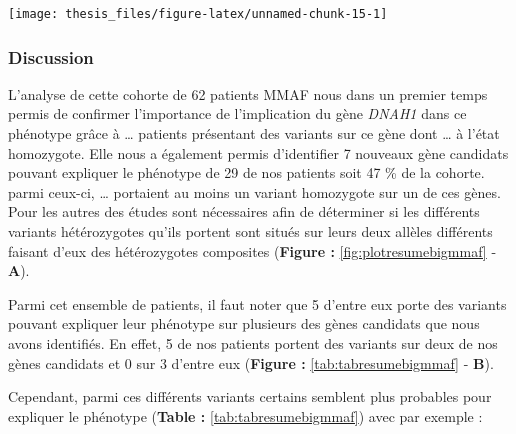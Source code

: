\documentclass[12pt,twoside]{reedthesis}
\theoremstyle{definition}
\theoremstyle{definition}
\theoremstyle{remark}
\begin{document}
  \begin{center}\texttt{[image: thesis\_files/figure-latex/unnamed-chunk-15-1]} \end{center}
  
  \newpage
  
  \newpage
  
  \subsubsection{Discussion}\label{discussion-1}
  
  L'analyse de cette cohorte de 62 patients MMAF nous dans un premier
  temps permis de confirmer l'importance de l'implication du gène
  \emph{DNAH1} dans ce phénotype grâce à \ldots{} patients présentant des
  variants sur ce gène dont \ldots{} à l'état homozygote. Elle nous a
  également permis d'identifier 7 nouveaux gène candidats pouvant
  expliquer le phénotype de 29 de nos patients soit 47 \% de la cohorte.
  parmi ceux-ci, \ldots{} portaient au moins un variant homozygote sur un
  de ces gènes. Pour les autres des études sont nécessaires afin de
  déterminer si les différents variants hétérozygotes qu'ils portent sont
  situés sur leurs deux allèles différents faisant d'eux des hétérozygotes
  composites (\textbf{Figure : }\ref{fig:plotresumebigmmaf} - \textbf{A}).
  
  Parmi cet ensemble de patients, il faut noter que 5 d'entre eux porte
  des variants pouvant expliquer leur phénotype sur plusieurs des gènes
  candidats que nous avons identifiés. En effet, 5 de nos patients portent
  des variants sur deux de nos gènes candidats et 0 sur 3 d'entre eux
  (\textbf{Figure : }\ref{tab:tabresumebigmmaf} - \textbf{B}).
  
  Cependant, parmi ces différents variants certains semblent plus
  probables pour expliquer le phénotype (\textbf{Table :
  }\ref{tab:tabresumebigmmaf}) avec par exemple :
  
\end{document}
